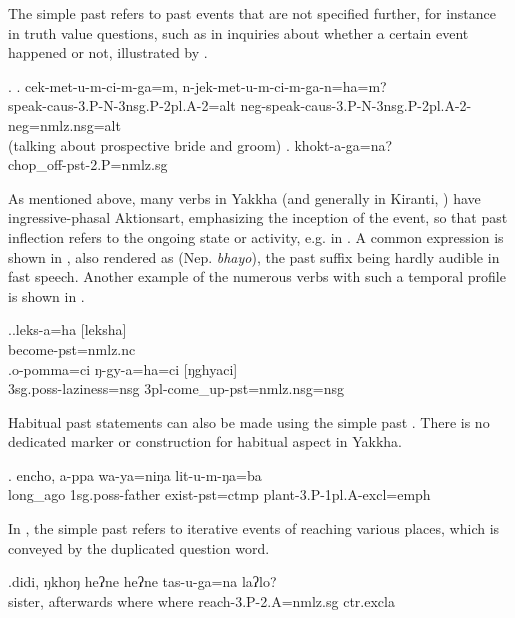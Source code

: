 The simple past  refers to past events that are not specified further, for instance in truth value questions, such as  in inquiries about whether a certain event happened or not, illustrated by \Next. 

\ex. \ag.  cek-met-u-m-ci-m-ga=m,                                    n-jek-met-u-m-ci-m-ga-n=ha=m?\\
speak{\sc -caus-3.P-N-3nsg.P-2pl.A-2=alt} {\sc neg-}speak{\sc -caus-3.P-N-3nsg.P-2pl.A-2-neg=nmlz.nsg=alt}\\
 (talking about prospective bride and groom) 
\bg. khokt-a-ga=na?\\
chop\_off{\sc -pst-2.P=nmlz.sg}\\
 


As mentioned above, many verbs in Yakkha (and generally in Kiranti, \citet[512]{Ebert2003Kiranti}) have ingressive-phasal Aktionsart, emphasizing the inception of the event, so that past inflection refers to the ongoing state or activity, e.g. in \Last[b]. A common expression is shown in \Next[a], also rendered as  (Nep. \emph{bhayo}), the past suffix being hardly audible in fast speech. Another example of the numerous verbs with such a temporal profile is shown in \Next[b].

\ex.\ag.leks-a=ha [leksha]\\
become{\sc [3sg]-pst=nmlz.nc}\\
\bg.o-pomma=ci ŋ-gy-a=ha=ci [ŋghyaci]\\
{\sc 3sg.poss-}laziness{\sc =nsg} {\sc 3pl-}come\_up{\sc -pst=nmlz.nsg=nsg}\\

Habitual past statements can also be made using the simple past \Next. There is no dedicated marker or construction for habitual aspect in Yakkha.

\exg. encho,        a-ppa             wa-ya=niŋa               lit-u-m-ŋa=ba\\
long\_ago {\sc 1sg.poss-}father exist{\sc [3]-pst=ctmp} plant{\sc [pst]-3.P-1pl.A-excl=emph}\\
 

In \Next, the simple past refers to iterative events of reaching various places, which is conveyed by the duplicated question word.

\exg.didi,        ŋkhoŋ    heʔne heʔne tas-u-ga=na                    laʔlo?\\
sister, afterwards where where reach{\sc [pst]-3.P-2.A=nmlz.sg} {\sc ctr.excla}\\
  

